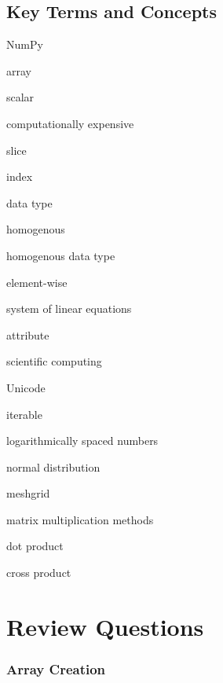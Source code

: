 \documentclass{book}
\newenvironment{key_terms}{\begin{multicols}{3}}{\end{multicols}} %
\begin{document}
    
        \hypertarget{key-terms-and-concepts}{%
\subsection{Key Terms and Concepts}\label{key-terms-and-concepts}}
    




    
        \begin{key_terms}
        NumPy

array

scalar

computationally expensive

slice

index

data type

homogenous

homogenous data type

element-wise

system of linear equations

attribute

scientific computing

Unicode

iterable

logarithmically spaced numbers

normal distribution

meshgrid

matrix multiplication methods

dot product

cross product
        \end{key_terms}

    




    
        \hypertarget{review-questions}{%
\section{Review Questions}\label{review-questions}}
    




    
        \hypertarget{array-creation}{%
\subsubsection{Array Creation}\label{array-creation}}
    
\end{document}
